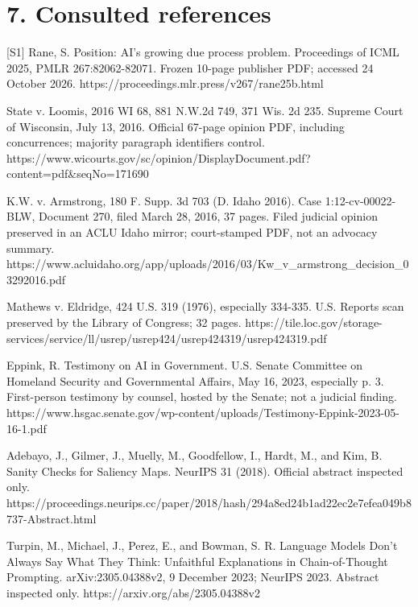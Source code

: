 \documentclass[10pt]{article}
\begin{document}
\section*{7. Consulted references}
[S1] Rane, S. Position: AI’s growing due process problem. Proceedings of ICML 2025, PMLR 267:82062-82071. Frozen 10-page publisher PDF; accessed 24 October 2026. https://proceedings.mlr.press/v267/rane25b.html\par
State v. Loomis, 2016 WI 68, 881 N.W.2d 749, 371 Wis. 2d 235. Supreme Court of Wisconsin, July 13, 2016. Official 67-page opinion PDF, including concurrences; majority paragraph identifiers control. https://www.wicourts.gov/sc/opinion/DisplayDocument.pdf?content=pdf\&seqNo=171690\par
K.W. v. Armstrong, 180 F. Supp. 3d 703 (D. Idaho 2016). Case 1:12-cv-00022-BLW, Document 270, filed March 28, 2016, 37 pages. Filed judicial opinion preserved in an ACLU Idaho mirror; court-stamped PDF, not an advocacy summary. https://www.acluidaho.org/app/uploads/2016/03/Kw\_v\_armstrong\_decision\_03292016.pdf\par
Mathews v. Eldridge, 424 U.S. 319 (1976), especially 334-335. U.S. Reports scan preserved by the Library of Congress; 32 pages. https://tile.loc.gov/storage-services/service/ll/usrep/usrep424/usrep424319/usrep424319.pdf\par
Eppink, R. Testimony on AI in Government. U.S. Senate Committee on Homeland Security and Governmental Affairs, May 16, 2023, especially p. 3. First-person testimony by counsel, hosted by the Senate; not a judicial finding. https://www.hsgac.senate.gov/wp-content/uploads/Testimony-Eppink-2023-05-16-1.pdf\par
Adebayo, J., Gilmer, J., Muelly, M., Goodfellow, I., Hardt, M., and Kim, B. Sanity Checks for Saliency Maps. NeurIPS 31 (2018). Official abstract inspected only. https://proceedings.neurips.cc/paper/2018/hash/294a8ed24b1ad22ec2e7efea049b8737-Abstract.html\par
Turpin, M., Michael, J., Perez, E., and Bowman, S. R. Language Models Don’t Always Say What They Think: Unfaithful Explanations in Chain-of-Thought Prompting. arXiv:2305.04388v2, 9 December 2023; NeurIPS 2023. Abstract inspected only. https://arxiv.org/abs/2305.04388v2\par
\end{document}
